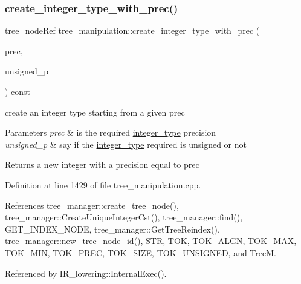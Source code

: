 \subsubsection{\texorpdfstring{create\+\_\+integer\+\_\+type\+\_\+with\+\_\+prec()}{create\_integer\_type\_with\_prec()}}
{\footnotesize\ttfamily \hyperlink{tree__node_8hpp_a6ee377554d1c4871ad66a337eaa67fd5}{tree\+\_\+node\+Ref} tree\+\_\+manipulation\+::create\+\_\+integer\+\_\+type\+\_\+with\+\_\+prec (\begin{DoxyParamCaption}\item[{unsigned int}]{prec,  }\item[{bool}]{unsigned\+\_\+p }\end{DoxyParamCaption}) const}



create an integer type starting from a given prec 


\begin{DoxyParams}{Parameters}
{\em prec} & is the required \hyperlink{structinteger__type}{integer\+\_\+type} precision \\
\hline
{\em unsigned\+\_\+p} & say if the \hyperlink{structinteger__type}{integer\+\_\+type} required is unsigned or not \\
\hline
\end{DoxyParams}
\begin{DoxyReturn}{Returns}
a new integer with a precision equal to prec 
\end{DoxyReturn}


Definition at line 1429 of file tree\+\_\+manipulation.\+cpp.



References tree\+\_\+manager\+::create\+\_\+tree\+\_\+node(), tree\+\_\+manager\+::\+Create\+Unique\+Integer\+Cst(), tree\+\_\+manager\+::find(), G\+E\+T\+\_\+\+I\+N\+D\+E\+X\+\_\+\+N\+O\+DE, tree\+\_\+manager\+::\+Get\+Tree\+Reindex(), tree\+\_\+manager\+::new\+\_\+tree\+\_\+node\+\_\+id(), S\+TR, T\+OK, T\+O\+K\+\_\+\+A\+L\+GN, T\+O\+K\+\_\+\+M\+AX, T\+O\+K\+\_\+\+M\+IN, T\+O\+K\+\_\+\+P\+R\+EC, T\+O\+K\+\_\+\+S\+I\+ZE, T\+O\+K\+\_\+\+U\+N\+S\+I\+G\+N\+ED, and TreeM.



Referenced by I\+R\+\_\+lowering\+::\+Internal\+Exec().

